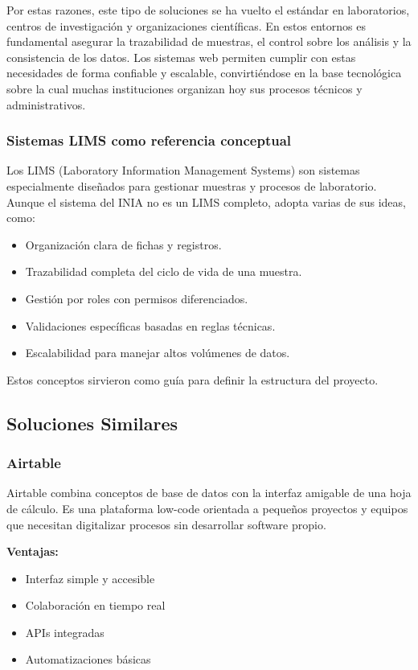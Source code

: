 Por estas razones, este tipo de soluciones se ha vuelto el estándar en laboratorios, centros de investigación y organizaciones científicas. En estos entornos es fundamental asegurar la trazabilidad de muestras, el control sobre los análisis y la consistencia de los datos. Los sistemas web permiten cumplir con estas necesidades de forma confiable y escalable, convirtiéndose en la base tecnológica sobre la cual muchas instituciones organizan hoy sus procesos técnicos y administrativos.

\subsubsection{Sistemas LIMS como referencia conceptual}

Los LIMS (Laboratory Information Management Systems) son sistemas especialmente diseñados para gestionar muestras y procesos de laboratorio. Aunque el sistema del INIA no es un LIMS completo, adopta varias de sus ideas, como:

\begin{itemize}
    \item Organización clara de fichas y registros.
    \item Trazabilidad completa del ciclo de vida de una muestra.
    \item Gestión por roles con permisos diferenciados.
    \item Validaciones específicas basadas en reglas técnicas.
    \item Escalabilidad para manejar altos volúmenes de datos.
\end{itemize}

Estos conceptos sirvieron como guía para definir la estructura del proyecto.

\subsection{Soluciones Similares}

\subsubsection{Airtable}

Airtable combina conceptos de base de datos con la interfaz amigable de una hoja de cálculo. Es una plataforma low-code orientada a pequeños proyectos y equipos que necesitan digitalizar procesos sin desarrollar software propio.

\textbf{Ventajas:}
\begin{itemize}
    \item Interfaz simple y accesible
    \item Colaboración en tiempo real
    \item APIs integradas
    \item Automatizaciones básicas
\end{itemize}

